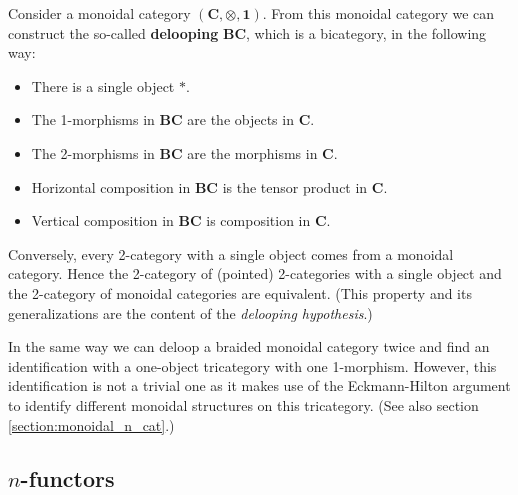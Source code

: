     \begin{property}\label{cat:monoidal_or_2}
        Consider a monoidal category $(\mathbf{C},\otimes,\mathbf{1})$. From this monoidal category we can construct the so-called \textbf{delooping} $\mathbf{BC}$, which is a bicategory, in the following way:
        \begin{itemize}
            \item There is a single object $\ast$.
            \item The 1-morphisms in $\mathbf{BC}$ are the objects in $\mathbf{C}$.
            \item The 2-morphisms in $\mathbf{BC}$ are the morphisms in $\mathbf{C}$.
            \item Horizontal composition in $\mathbf{BC}$ is the tensor product in $\mathbf{C}$.
            \item Vertical composition in $\mathbf{BC}$ is composition in $\mathbf{C}$.
        \end{itemize}
        Conversely, every 2-category with a single object comes from a monoidal category. Hence the 2-category of (pointed) 2-categories with a single object and the 2-category of monoidal categories are equivalent. (This property and its generalizations are the content of the \textit{delooping hypothesis}.)

        In the same way we can deloop a braided monoidal category twice and find an identification with a one-object tricategory with one 1-morphism. However, this identification is not a trivial one as it makes use of the Eckmann-Hilton argument to identify different monoidal structures on this tricategory. (See also section \ref{section:monoidal_n_cat}.)
    \end{property}

\subsection{\texorpdfstring{$n$-functors}{n-functors}}


